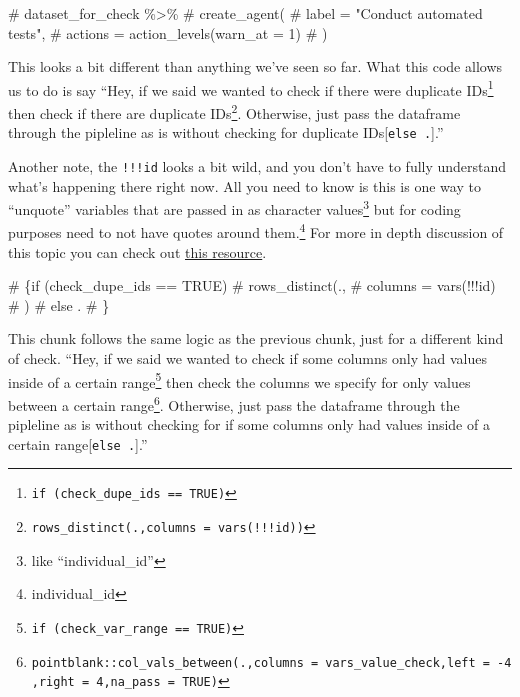 \documentclass[
  letterpaper,
  DIV=11,
  numbers=noendperiod]{scrreprt}
\newenvironment{Shaded}{\begin{snugshade}}{\end{snugshade}}
\newcommand{\CommentTok}[1]{\textcolor[rgb]{0.37,0.37,0.37}{#1}}
\begin{document}
\begin{Shaded}
\begin{Highlighting}[]
\CommentTok{\# dataset\_for\_check \%\textgreater{}\%}
\CommentTok{\#       create\_agent(}
\CommentTok{\#         label = "Conduct automated tests",}
\CommentTok{\#         actions = action\_levels(warn\_at = 1)}
\CommentTok{\#       ) }
\end{Highlighting}
\end{Shaded}

This looks a bit different than anything we've seen so far. What this
code allows us to do is say ``Hey, if we said we wanted to check if
there were duplicate IDs\footnote{\texttt{if\ (check\_dupe\_ids\ ==\ TRUE)}}
then check if there are duplicate IDs\footnote{\texttt{rows\_distinct(.,columns\ =\ vars(!!!id))}}.
Otherwise, just pass the dataframe through the pipleline as is without
checking for duplicate IDs{[}\texttt{else\ .}{]}.''

Another note, the \texttt{!!!id} looks a bit wild, and you don't have to
fully understand what's happening there right now. All you need to know
is this is one way to ``unquote'' variables that are passed in as
character values\footnote{like ``individual\_id''} but for coding
purposes need to not have quotes around them.\footnote{individual\_id}
For more in depth discussion of this topic you can check out
\href{https://dplyr.tidyverse.org/articles/programming.html}{this
resource}.

\begin{Shaded}
\begin{Highlighting}[]
\CommentTok{\# \{if (check\_dupe\_ids == TRUE)}
\CommentTok{\#         rows\_distinct(.,}
\CommentTok{\#           columns = vars(!!!id)}
\CommentTok{\#           )}
\CommentTok{\#         else .}
\CommentTok{\#         \}}
\end{Highlighting}
\end{Shaded}

This chunk follows the same logic as the previous chunk, just for a
different kind of check. ``Hey, if we said we wanted to check if some
columns only had values inside of a certain range\footnote{\texttt{if\ (check\_var\_range\ ==\ TRUE)}}
then check the columns we specify for only values between a certain
range\footnote{\texttt{pointblank::col\_vals\_between(.,columns\ =\ vars\_value\_check,left\ =\ -4,right\ =\ 4,na\_pass\ =\ TRUE)}}.
Otherwise, just pass the dataframe through the pipleline as is without
checking for if some columns only had values inside of a certain
range{[}\texttt{else\ .}{]}.''
\end{document}

